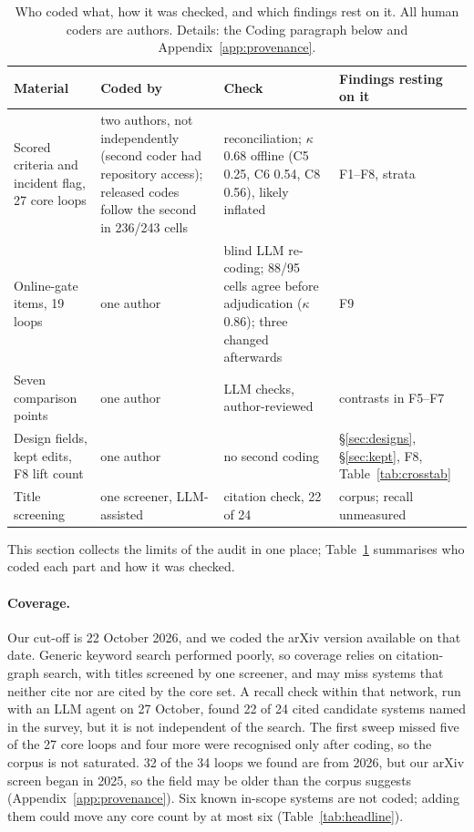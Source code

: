 \documentclass[sigconf,nonacm]{acmart}
\begin{document}
\begin{table}[t]
\caption{Who coded what, how it was checked, and which findings rest on it. All human coders are authors. Details: the Coding paragraph below and Appendix~\ref{app:provenance}.}\label{tab:whocoded}
\centering\small
\begin{tabular}{@{}p{3.9cm}p{2.6cm}p{3.3cm}p{3.6cm}@{}}
\toprule
Material & Coded by & Check & Findings resting on it \\
\midrule
Scored criteria and incident flag, 27 core loops & two authors, not independently (second coder had repository access); released codes follow the second in 236/243 cells & reconciliation; $\kappa$ 0.68 offline (C5 0.25, C6 0.54, C8 0.56), likely inflated & F1--F8, strata \\
Online-gate items, 19 loops & one author & blind LLM re-coding; 88/95 cells agree before adjudication ($\kappa$ 0.86); three changed afterwards & F9 \\
Seven comparison points & one author & LLM checks, author-reviewed & contrasts in F5--F7 \\
Design fields, kept edits, F8 lift count & one author & no second coding & \S\ref{sec:designs}, \S\ref{sec:kept}, F8, Table~\ref{tab:crosstab} \\
Title screening & one screener, LLM-assisted & citation check, 22 of 24 & corpus; recall unmeasured \\
\bottomrule
\end{tabular}
\end{table}

This section collects the limits of the audit in one place; Table~\ref{tab:whocoded} summarises who coded each
part and how it was checked.

\paragraph{Coverage.} Our cut-off is 22 October 2026, and we coded the arXiv version available on that date. Generic
keyword search performed poorly, so coverage relies on citation-graph search, with titles screened by one screener,
and may miss systems that neither cite nor are cited by the core set. A recall check within that network, run with an
LLM agent on 27 October, found 22 of 24 cited candidate systems named in the survey, but it is not independent of the
search. The first sweep missed five of the 27 core loops and four more were recognised only after coding, so the
corpus is not saturated. 32 of the 34 loops we found are from 2026, but our arXiv screen began in 2025, so the field may be
older than the corpus suggests (Appendix~\ref{app:provenance}). Six known in-scope systems are not coded; adding them
could move any core count by at most six (Table~\ref{tab:headline}).
\end{document}

